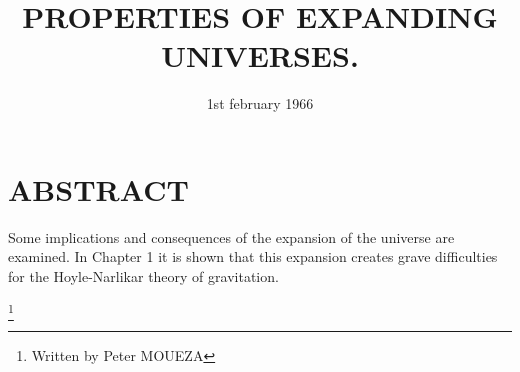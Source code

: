\documentclass{article}
\title{\textbf{PROPERTIES OF EXPANDING UNIVERSES.}}
\date{1st february 1966}
\begin{document}



\part{\textbf{ABSTRACT}}


Some implications and consequences of the expansion of the universe are examined. In Chapter 1 it is shown that this expansion creates grave difficulties for the Hoyle-Narlikar theory of gravitation.




\footnote{Written by Peter MOUEZA}
\end{document}
